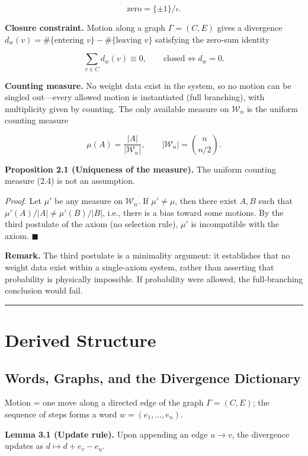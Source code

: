 \documentclass[
  11pt,
]{article}
\begin{document}
\[
\text{zero} = \{\pm1\}/\iota.
\tag{2.2}
\]

\textbf{Closure constraint.} Motion along a graph \(\Gamma=(C,E)\) gives
a divergence \(d_w(v)=\#\{\text{entering }v\}-\#\{\text{leaving }v\}\)
satisfying the zero-sum identity

\[
\sum_{v\in C} d_w(v) \equiv 0, \qquad \text{closed} \iff d_w = 0.
\tag{2.3}
\]

\textbf{Counting measure.} No weight data exist in the system, so no
motion can be singled out---every allowed motion is instantiated (full
branching), with multiplicity given by counting. The only available
measure on \(\mathcal{W}_n\) is the uniform counting measure

\[
\mu(A) = \frac{|A|}{|\mathcal{W}_n|}, \qquad |\mathcal{W}_n| = \binom{n}{n/2}.
\tag{2.4}
\]

\textbf{Proposition 2.1 (Uniqueness of the measure).} The uniform
counting measure (2.4) is not an assumption.

\emph{Proof.} Let \(\mu'\) be any measure on \(\mathcal{W}_n\). If
\(\mu'\neq\mu\), then there exist \(A,B\) such that
\(\mu'(A)/|A|\neq\mu'(B)/|B|\), i.e., there is a bias toward some
motions. By the third postulate of the axiom (no selection rule),
\(\mu'\) is incompatible with the axiom. \(\blacksquare\)

\textbf{Remark.} The third postulate is a minimality argument: it
establishes that no weight data exist within a single-axiom system,
rather than asserting that probability is physically impossible. If
probability were allowed, the full-branching conclusion would fail.

\begin{center}\rule{0.5\linewidth}{0.5pt}\end{center}

\section{Derived Structure}\label{derived-structure}

\subsection{Words, Graphs, and the Divergence
Dictionary}\label{words-graphs-and-the-divergence-dictionary}

Motion = one move along a directed edge of the graph \(\Gamma=(C,E)\);
the sequence of steps forms a word \(w=(e_1,\dots,e_n)\).

\textbf{Lemma 3.1 (Update rule).} Upon appending an edge \(u\to v\), the
divergence updates as \(d\mapsto d+e_v-e_u\).
\end{document}
